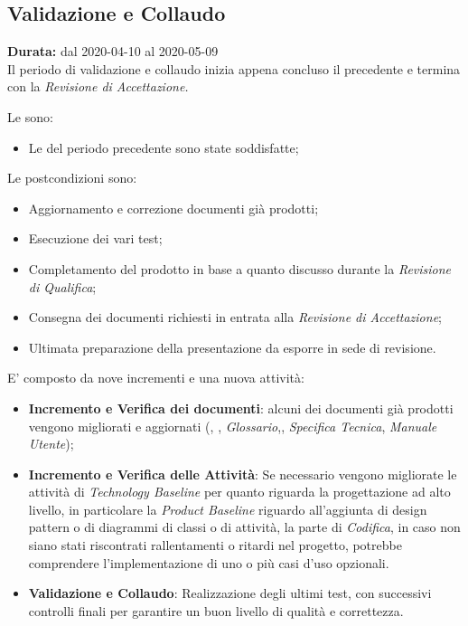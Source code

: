 \subsection{Validazione e Collaudo}
\label{validazione_e_collaudo}
\textbf{Durata:} dal 2020-04-10 al 2020-05-09 \\
Il periodo di validazione e collaudo inizia appena concluso il precedente e termina con la \textit{Revisione di Accettazione.}

Le  sono:
\begin{itemize}
    \item Le  del periodo precedente sono state soddisfatte;
\end{itemize}

Le postcondizioni sono:
\begin{itemize}
    \item Aggiornamento e correzione documenti già prodotti;
    \item Esecuzione dei vari test;
    \item Completamento del prodotto in base a quanto discusso durante la \textit{Revisione di Qualifica};
    \item Consegna dei documenti richiesti in entrata alla \textit{Revisione di Accettazione};
    \item Ultimata preparazione della presentazione da esporre in sede di revisione.
\end{itemize}
E' composto da nove incrementi e una nuova attività:
\begin{itemize}
    \item \textbf{Incremento e Verifica dei documenti}: alcuni dei documenti già prodotti vengono migliorati e aggiornati (\textit{\NdP}, \textit{\PdP}, \textit{Glossario},\textit{\PdQ}, \textit{Specifica Tecnica}, \textit{Manuale Utente}); 
    \item \textbf{Incremento e Verifica delle Attività}: Se necessario vengono migliorate le attività di \textit{Technology Baseline} per quanto riguarda la progettazione ad alto livello, in particolare la \textit{Product Baseline} riguardo all'aggiunta di design pattern o di diagrammi di classi o di attività, la parte di \textit{Codifica}, in caso non siano stati riscontrati rallentamenti o ritardi nel progetto, potrebbe comprendere l'implementazione di uno o più casi d'uso opzionali.
    \item \textbf{Validazione e Collaudo}: Realizzazione degli ultimi test, con successivi controlli finali per garantire un buon livello di qualità e correttezza.
\end{itemize}

